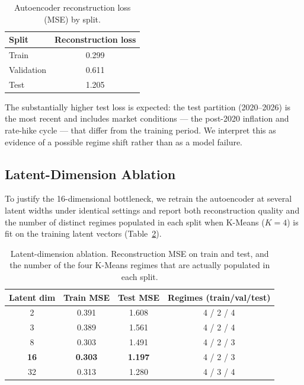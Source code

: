 \documentclass[conference]{IEEEtran}
\begin{document}
\begin{table}[h]
\centering
\caption{Autoencoder reconstruction loss (MSE) by split.}
\label{tab:recon}
\begin{tabular}{lc}
\toprule
Split & Reconstruction loss \\
\midrule
Train & 0.299 \\
Validation & 0.611 \\
Test & 1.205 \\
\bottomrule
\end{tabular}
\end{table}

The substantially higher test loss is expected: the test partition (2020--2026)
is the most recent and includes market conditions --- the post-2020 inflation
and rate-hike cycle --- that differ from the training period. We interpret this
as evidence of a possible regime shift rather than as a model failure.

\subsection{Latent-Dimension Ablation}
\label{sec:ablation}

To justify the 16-dimensional bottleneck, we retrain the autoencoder at several
latent widths under identical settings and report both reconstruction quality and
the number of distinct regimes populated in each split when K-Means ($K=4$) is fit
on the training latent vectors (Table~\ref{tab:ablation}).

\begin{table}[h]
\centering
\caption{Latent-dimension ablation. Reconstruction MSE on train and test, and the
number of the four K-Means regimes that are actually populated in each split.}
\label{tab:ablation}
\begin{tabular}{cccc}
\toprule
Latent dim & Train MSE & Test MSE & Regimes (train/val/test) \\
\midrule
2  & 0.391 & 1.608 & 4 / 2 / 4 \\
3  & 0.389 & 1.561 & 4 / 2 / 4 \\
8  & 0.303 & 1.491 & 4 / 2 / 3 \\
\textbf{16} & \textbf{0.303} & \textbf{1.197} & 4 / 2 / 3 \\
32 & 0.313 & 1.280 & 4 / 3 / 4 \\
\bottomrule
\end{tabular}
\end{table}
\end{document}
